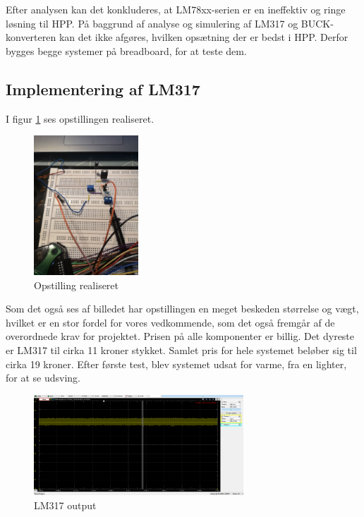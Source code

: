 Efter analysen kan det konkluderes, at LM78xx-serien er en ineffektiv og ringe løsning til HPP. På baggrund af analyse og simulering af LM317 og BUCK-konverteren kan det ikke afgøres, hvilken opsætning der er bedst i HPP. Derfor bygges begge systemer på breadboard, for at teste dem.

\subsection{Implementering af LM317}
\label{sec:impl-af-lm317}

I figur \ref{fig:j6} ses opstillingen realiseret. 
\clearpage
\begin{figure}[h]
  \centering
  \includegraphics[width=0.35\textwidth]{./figurer/j6.png}
  \caption{Opstilling realiseret}
  \label{fig:j6}
\end{figure}


Som det også ses af billedet har opstillingen en meget beskeden størrelse og vægt, hvilket er en stor fordel for vores vedkommende, som det også fremgår af de overordnede krav for projektet. Prisen på alle komponenter er billig. Det dyreste er LM317 til cirka 11 kroner stykket. Samlet pris for hele systemet beløber sig til cirka 19 kroner. Efter første test, blev systemet udsat for varme, fra en lighter, for at se udsving.
\begin{figure}[h]
  \centering
  \includegraphics[width=0.7\textwidth]{./figurer/j7.png}
  \caption{LM317 output}
  \label{fig:j7}
\end{figure}

